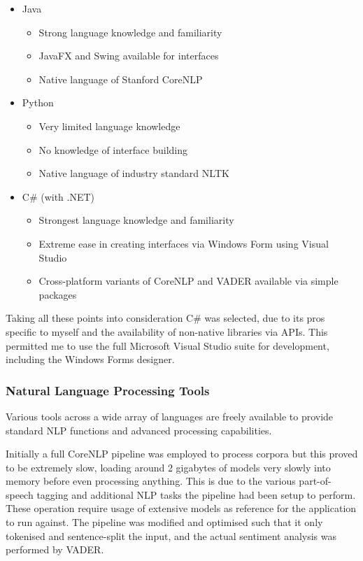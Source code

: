 \documentclass{article}
\begin{document}
        \begin{itemize}
            \item Java
            \begin{itemize}
                \item Strong language knowledge and familiarity
                \item JavaFX and Swing available for interfaces
                \item Native language of Stanford CoreNLP
            \end{itemize}
            \item Python
            \begin{itemize}
                \item Very limited language knowledge
                \item No knowledge of interface building
                \item Native language of industry standard NLTK
            \end{itemize}
            \item C\# (with .NET)
            \begin{itemize}
                \item Strongest language knowledge and familiarity
                \item Extreme ease in creating interfaces via Windows Form using Visual Studio
                \item Cross-platform variants of CoreNLP and VADER available via simple packages
            \end{itemize}
        \end{itemize}
        Taking all these points into consideration C\# was selected, due to its pros specific to myself and the availability of non-native libraries via APIs. This permitted me to use the full Microsoft Visual Studio suite for development, including the Windows Forms designer.
        \subsubsection{Natural Language Processing Tools}
        \label{subsec:nlpTools}
        Various tools across a wide array of languages are freely available to provide standard NLP functions and advanced processing capabilities.

        Initially a full CoreNLP pipeline was employed to process corpora but this proved to be extremely slow, loading around 2 gigabytes of models very slowly into memory before even processing anything. This is due to the various part-of-speech tagging and additional NLP tasks the pipeline had been setup to perform. These operation require usage of extensive models as reference for the application to run against. The pipeline was modified and optimised such that it only tokenised and sentence-split the input, and the actual sentiment analysis was performed by VADER.
\end{document}
